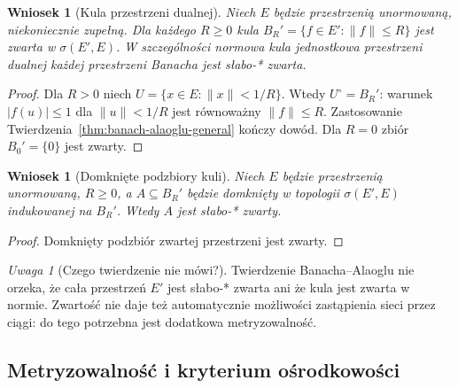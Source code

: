 \documentclass[11pt,a4paper]{article}
\numberwithin{equation}{section}
\theoremstyle{plain}
\newtheorem{wniosek}[twierdzenie]{Wniosek}
\theoremstyle{definition}
\theoremstyle{remark}
\newtheorem{uwaga}[twierdzenie]{Uwaga}
\begin{document}
\begin{wniosek}[Kula przestrzeni dualnej]\label{cor:alaoglu-norm}
Niech $E$ będzie przestrzenią unormowaną, niekoniecznie zupełną.
Dla każdego $R\ge0$ kula
$B_R'=\{f\in E':\|f\|\le R\}$ jest zwarta w $\sigma(E',E)$.
W szczególności normowa kula jednostkowa przestrzeni dualnej
każdej przestrzeni Banacha jest słabo-* zwarta.
\end{wniosek}
\begin{proof}
Dla $R>0$ niech $U=\{x\in E:\|x\|<1/R\}$.
Wtedy $U^\circ=B_R'$: warunek $|f(u)|\le1$ dla $\|u\|<1/R$
jest równoważny $\|f\|\le R$. Zastosowanie
Twierdzenia~\ref{thm:banach-alaoglu-general} kończy dowód.
Dla $R=0$ zbiór $B_0'=\{0\}$ jest zwarty.
\end{proof}

\begin{wniosek}[Domknięte podzbiory kuli]\label{cor:alaoglu-closed}
Niech $E$ będzie przestrzenią unormowaną, $R\ge0$, a
$A\subseteq B_R'$ będzie domknięty w topologii
$\sigma(E',E)$ indukowanej na $B_R'$. Wtedy $A$ jest
słabo-* zwarty.
\end{wniosek}
\begin{proof}
Domknięty podzbiór zwartej przestrzeni jest zwarty.
\end{proof}

\begin{uwaga}[Czego twierdzenie nie mówi?]
Twierdzenie Banacha--Alaoglu nie orzeka, że cała przestrzeń $E'$
jest słabo-* zwarta ani że kula jest zwarta w normie.
Zwartość nie daje też automatycznie możliwości zastąpienia
sieci przez ciągi: do tego potrzebna jest dodatkowa metryzowalność.
\end{uwaga}

\subsection{Metryzowalność i kryterium ośrodkowości}
\end{document}
